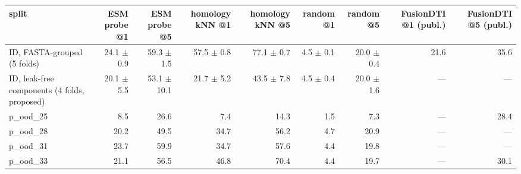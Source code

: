 \begin{tabular}{lrrrrrrrr}
\toprule
split & ESM probe @1 & ESM probe @5 & homology kNN @1 & homology kNN @5 & random @1 & random @5 & FusionDTI @1 (publ.) & FusionDTI @5 (publ.) \\ \midrule
ID, FASTA-grouped (5 folds) & 24.1 $\pm$ 0.9 & 59.3 $\pm$ 1.5 & 57.5 $\pm$ 0.8 & 77.1 $\pm$ 0.7 & 4.5 $\pm$ 0.1 & 20.0 $\pm$ 0.4 & 21.6 & 35.6 \\
ID, leak-free components (4 folds, proposed) & 20.1 $\pm$ 5.5 & 53.1 $\pm$ 10.1 & 21.7 $\pm$ 5.2 & 43.5 $\pm$ 7.8 & 4.5 $\pm$ 0.4 & 20.0 $\pm$ 1.6 & — & — \\
p\_ood\_25 & 8.5 & 26.6 & 7.4 & 14.3 & 1.5 & 7.3 & — & 28.4 \\
p\_ood\_28 & 20.2 & 49.5 & 34.7 & 56.2 & 4.7 & 20.9 & — & — \\
p\_ood\_31 & 23.7 & 59.9 & 34.7 & 57.6 & 4.4 & 19.8 & — & — \\
p\_ood\_33 & 21.1 & 56.5 & 46.8 & 70.4 & 4.4 & 19.7 & — & 30.1 \\
\bottomrule
\end{tabular}
